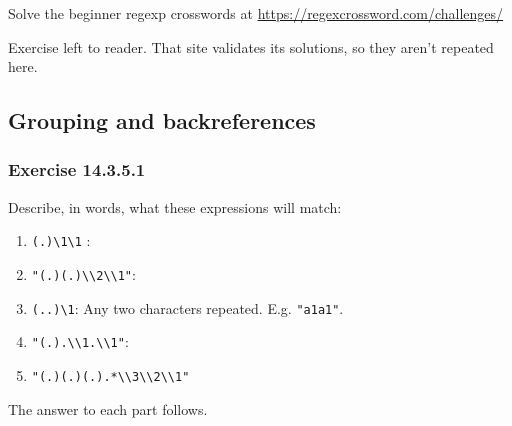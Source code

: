 \documentclass[]{book}
\providecommand{\tightlist}{%
  \setlength{\itemsep}{0pt}\setlength{\parskip}{0pt}}
\theoremstyle{plain}
\theoremstyle{remark}
\begin{document}
Solve the beginner regexp crosswords at
\url{https://regexcrossword.com/challenges/}

Exercise left to reader. That site validates its solutions, so they
aren't repeated here.

\hypertarget{grouping-and-backreferences}{%
\subsection{Grouping and
backreferences}\label{grouping-and-backreferences}}

\hypertarget{exercise-14.3.5.1}{%
\subsubsection*{\texorpdfstring{Exercise
{14.3.5.1}}{Exercise 14.3.5.1}}\label{exercise-14.3.5.1}}

Describe, in words, what these expressions will match:

\begin{enumerate}
\def\labelenumi{\arabic{enumi}.}
\tightlist
\item
  \texttt{(.)\textbackslash{}1\textbackslash{}1} :
\item
  \texttt{"(.)(.)\textbackslash{}\textbackslash{}2\textbackslash{}\textbackslash{}1"}:
\item
  \texttt{(..)\textbackslash{}1}: Any two characters repeated. E.g.
  \texttt{"a1a1"}.
\item
  \texttt{"(.).\textbackslash{}\textbackslash{}1.\textbackslash{}\textbackslash{}1"}:
\item
  \texttt{"(.)(.)(.).*\textbackslash{}\textbackslash{}3\textbackslash{}\textbackslash{}2\textbackslash{}\textbackslash{}1"}
\end{enumerate}

The answer to each part follows.
\end{document}
